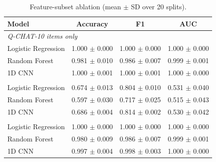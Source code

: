 \begin{table}[t]
\centering
\caption{Feature-subset ablation (mean $\pm$ SD over 20 splits).}
\label{tab:ablation}
\footnotesize
\setlength{\tabcolsep}{4pt}
\begin{tabular}{lccc}
\toprule
Model & Accuracy & F1 & AUC \\
\midrule
\multicolumn{4}{l}{\textit{Q-CHAT-10 items only}} \\
\quad Logistic Regression & 1.000 $\pm$ 0.000 & 1.000 $\pm$ 0.000 & 1.000 $\pm$ 0.000 \\
\quad Random Forest & 0.981 $\pm$ 0.010 & 0.986 $\pm$ 0.007 & 0.999 $\pm$ 0.001 \\
\quad 1D CNN & 1.000 $\pm$ 0.001 & 1.000 $\pm$ 0.001 & 1.000 $\pm$ 0.000 \\
\addlinespace
\multicolumn{4}{l}{\textit{Demographics only}} \\
\quad Logistic Regression & 0.674 $\pm$ 0.013 & 0.804 $\pm$ 0.010 & 0.531 $\pm$ 0.040 \\
\quad Random Forest & 0.597 $\pm$ 0.030 & 0.717 $\pm$ 0.025 & 0.515 $\pm$ 0.043 \\
\quad 1D CNN & 0.686 $\pm$ 0.004 & 0.814 $\pm$ 0.002 & 0.530 $\pm$ 0.042 \\
\addlinespace
\multicolumn{4}{l}{\textit{All features}} \\
\quad Logistic Regression & 1.000 $\pm$ 0.000 & 1.000 $\pm$ 0.000 & 1.000 $\pm$ 0.000 \\
\quad Random Forest & 0.980 $\pm$ 0.009 & 0.986 $\pm$ 0.007 & 0.999 $\pm$ 0.001 \\
\quad 1D CNN & 0.997 $\pm$ 0.004 & 0.998 $\pm$ 0.003 & 1.000 $\pm$ 0.000 \\
\bottomrule
\end{tabular}
\end{table}